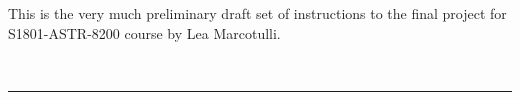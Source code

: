 \documentclass{article}
\newcounter{counter}
\newcounter{table_counter}
\begin{document}
This is the very much preliminary draft set of instructions to the final project for S1801-ASTR-8200 course by Lea Marcotulli.





%
%
%
%
%
%
%
%

\ \hrule
\end{document}
